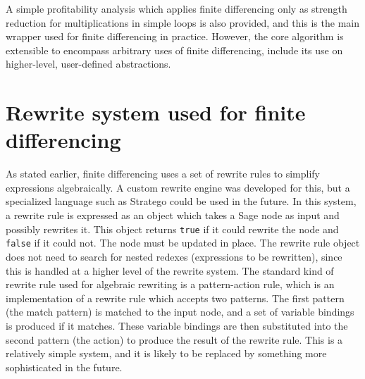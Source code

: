 \documentclass{article}
\begin{document}
A simple profitability analysis which applies finite differencing only as
strength reduction for multiplications in simple loops is also provided,
and this is the main wrapper used for finite differencing in practice.
However, the core algorithm is extensible to encompass arbitrary uses of
finite differencing, include its use on higher-level, user-defined
abstractions.

\section*{Rewrite system used for finite differencing}

As stated earlier, finite differencing uses a set of rewrite rules to
simplify expressions algebraically.  A custom rewrite engine was developed
for this, but a specialized language such as Stratego could be used in the
future.  In this system, a rewrite rule is expressed as an object which
takes a Sage node as input and possibly rewrites it.  This object returns
\lstinline{true} if it could rewrite the node and \lstinline{false} if it
could not.  The node must be updated in place.  The rewrite rule object
does not need to search for nested redexes (expressions to be rewritten),
since this is handled at a higher level of the rewrite system.  The
standard kind of rewrite rule used for algebraic rewriting is a
pattern-action rule, which is an implementation of a rewrite rule which
accepts two patterns.  The first pattern (the match pattern) is matched to
the input node, and a set of variable bindings is produced if it matches.
These variable bindings are then substituted into the second pattern (the
action) to produce the result of the rewrite rule.  This is a relatively
simple system, and it is likely to be replaced by something more
sophisticated in the future.



\end{document}
